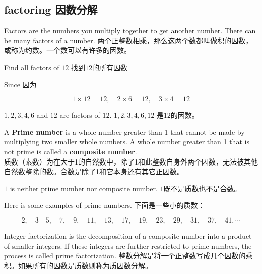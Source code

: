 \subsection{factoring 因数分解}
\begin{paracol}{2}
Factors are the numbers you multiply together to get another number. There can be many factors of a number.
\switchcolumn
两个正整数相乘，那么这两个数都叫做积的因数，或称为约数。一个数可以有许多的因数。
\end{paracol}

\begin{example}
Find all factors of $12$ 找到$12$的所有因数\\
\end{example}
\begin{solution}
\begin{paracol}{2}
Since 
\switchcolumn 
因为
\end{paracol}
$$
1\times 12 = 12, \quad 2\times 6 = 12,\quad 3\times 4 = 12
$$
\begin{paracol}{2}
$1, 2, 3, 4, 6$ and $12$ are factors of $12$.
\switchcolumn 
 $1, 2, 3, 4, 6, 12$ 是$12$的因数。
\end{paracol}
\end{solution}

\begin{newdef}
A {\bf Prime number} is a whole number greater than 1 that cannot be made by multiplying two smaller whole numbers. A whole number greater than 1 that is not prime is called a {\bf composite number}.\\
质数（素数）为在大于1的自然数中，除了1和此整数自身外两个因数，无法被其他自然数整除的数。合数是除了1和它本身还有其它正因数。
\end{newdef}

\begin{note}
$1$ is neither prime number nor composite number. $1$既不是质数也不是合数。
\end{note}

\begin{paracol}{2}
Here is some examples of prime numbers.
\switchcolumn
下面是一些小的质数：
\end{paracol}
$$
2,\quad 3\quad 5,\quad 7,\quad 9,\quad 11,\quad 13,\quad 17,\quad 19,\quad 23,\quad 29,\quad 31,\quad 37,\quad 41,\cdots
$$



\begin{paracol}{2}
Integer factorization is the decomposition of a composite number into a product of smaller integers. If these integers are further restricted to prime numbers, the process is called prime factorization.
\switchcolumn
整数分解是将一个正整数写成几个因数的乘积。如果所有的因数是质数则称为质因数分解。
\end{paracol}

